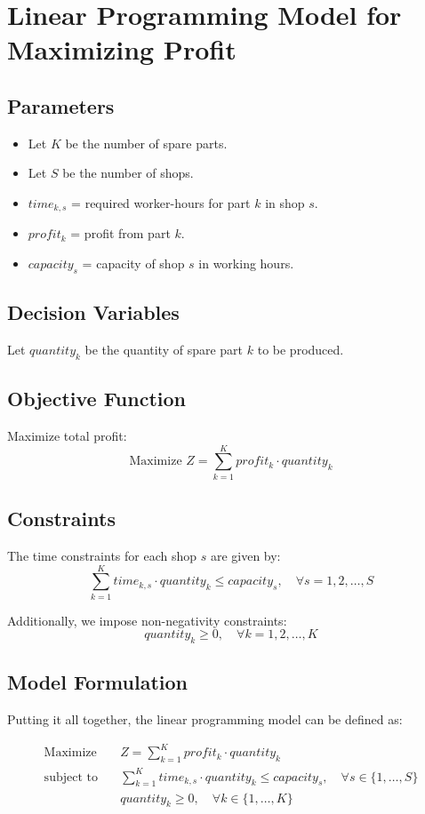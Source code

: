 \documentclass{article}
\begin{document}
\section*{Linear Programming Model for Maximizing Profit}

\subsection*{Parameters}
\begin{itemize}
    \item Let \( K \) be the number of spare parts.
    \item Let \( S \) be the number of shops.
    \item \( time_{k,s} \) = required worker-hours for part \( k \) in shop \( s \).
    \item \( profit_{k} \) = profit from part \( k \).
    \item \( capacity_{s} \) = capacity of shop \( s \) in working hours.
\end{itemize}

\subsection*{Decision Variables}
Let \( quantity_{k} \) be the quantity of spare part \( k \) to be produced.

\subsection*{Objective Function}
Maximize total profit:
\[
\text{Maximize } Z = \sum_{k=1}^{K} profit_{k} \cdot quantity_{k}
\]

\subsection*{Constraints}
The time constraints for each shop \( s \) are given by:
\[
\sum_{k=1}^{K} time_{k,s} \cdot quantity_{k} \leq capacity_{s}, \quad \forall s = 1, 2, \ldots, S
\]

Additionally, we impose non-negativity constraints:
\[
quantity_{k} \geq 0, \quad \forall k = 1, 2, \ldots, K
\]

\subsection*{Model Formulation}
Putting it all together, the linear programming model can be defined as:

\[
\begin{align*}
\text{Maximize} & \quad Z = \sum_{k=1}^{K} profit_{k} \cdot quantity_{k} \\
\text{subject to} & \quad \sum_{k=1}^{K} time_{k,s} \cdot quantity_{k} \leq capacity_{s}, \quad \forall s \in \{1, \ldots, S\} \\
& \quad quantity_{k} \geq 0, \quad \forall k \in \{1, \ldots, K\}
\end{align*}
\]
\end{document}
